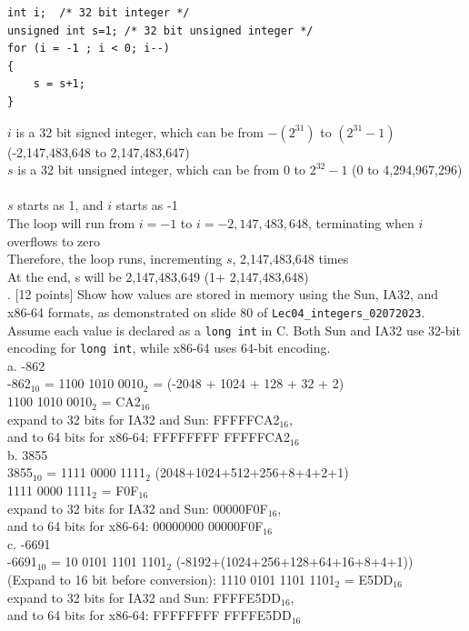 \documentclass[12pt]{extarticle}
\begin{document}
\begin{verbatim}
int i;  /* 32 bit integer */
unsigned int s=1; /* 32 bit unsigned integer */
for (i = -1 ; i < 0; i--) 
{
    s = s+1; 
}
\end{verbatim}
$i$ is a 32 bit signed integer, which can be from $-(2^{31})$ to $(2^{31}-1)$ \\ (-2,147,483,648 to 2,147,483,647)\\
$s$ is a 32 bit unsigned integer, which can be from $0$ to $2^{32}-1$ (0 to 4,294,967,296)\\~\\
$s$ starts as 1, and $i$ starts as -1\\
The loop will run from $i=-1$ to $i=-2,147,483,648$, terminating when $i$ overflows to zero\\
Therefore, the loop runs, incrementing $s$, 2,147,483,648 times\\
At the end, s will be 2,147,483,649 (1+ 2,147,483,648)\\

. [12 points] Show how values are stored in memory using the Sun, IA32, and x86-64 formats, as demonstrated on slide 80 of \texttt{Lec04\_integers\_02072023}. Assume each value is declared as a \texttt{long int} in C. Both Sun and IA32 use 32-bit encoding for \texttt{long int}, while x86-64 uses 64-bit encoding.\\

a. -862 \\
-862$_{10}$ = 1100 1010 0010$_{2}$ = (-2048 + 1024 + 128 + 32 + 2)\\
1100 1010 0010$_{2}$ = CA2$_{16}$\\
expand to 32 bits for IA32 and Sun: FFFFFCA2$_{16}$, \\
and to 64 bits for x86-64: FFFFFFFF FFFFFCA2$_{16}$\\

b. 3855 \\
3855$_{10}$ = 1111 0000 1111$_{2}$ (2048+1024+512+256+8+4+2+1)\\
1111 0000 1111$_{2}$ = F0F$_{16}$ \\
expand to 32 bits for IA32 and Sun: 00000F0F$_{16}$, \\
and to 64 bits for x86-64: 00000000 00000F0F$_{16}$\\

c. -6691 \\
-6691$_{10}$ = 10 0101 1101 1101$_{2}$ (-8192+(1024+256+128+64+16+8+4+1))\\
(Expand to 16 bit before conversion): 1110 0101 1101 1101$_{2}$ = E5DD$_{16}$ \\
expand to 32 bits for IA32 and Sun: FFFFE5DD$_{16}$, \\
and to 64 bits for x86-64: FFFFFFFF FFFFE5DD$_{16}$\\
\end{document}
